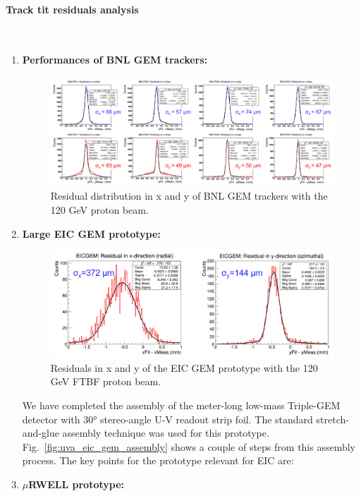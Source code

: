 \paragraph*{Track tit residuals analysis}\mbox{}\\
%
\begin{enumerate}
\item \textbf{Performances of BNL GEM trackers:}
%
\begin{figure}[htb]
\centering
\includegraphics[width=1\columnwidth,trim={0pt 0mm 0pt 0mm},clip]{UVa_plots/trkResidual}
\caption{\label{fig:trkResidual} Residual distribution in x and y of BNL GEM trackers with the 120 GeV proton beam.}
\end{figure}
\item \textbf{Large EIC GEM prototype:}
\begin{figure}[htb]
\centering
\includegraphics[width=1\columnwidth,trim={0pt 0mm 0pt 0mm},clip]{UVa_plots/eicResidual}
\caption{\label{fig:eicResidual} Residuals in x and y of the EIC GEM prototype with the 120 GeV FTBF proton beam.}
\end{figure}
%
We have completed the assembly of the meter-long low-mass Triple-GEM detector with \ang{30} stereo-angle U-V readout strip foil. The standard stretch-and-glue assembly technique was used for this prototype. Fig.~\ref{fig:uva_eic_gem_assembly} shows a couple of steps from this assembly process. The key points for the prototype relevant for EIC are:
%
\item \textbf{$\mu$RWELL prototype:}

\end{enumerate}
